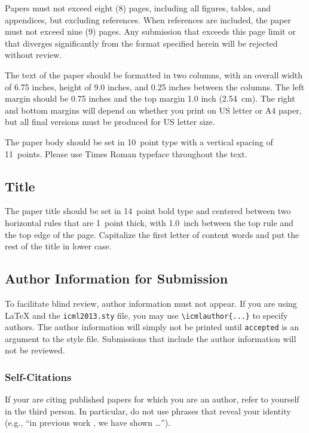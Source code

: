 \documentclass{article}
\begin{document}
Papers must not exceed eight (8) pages, including all figures, tables,
and appendices, but excluding references. When references are included,
the paper must not exceed nine (9) pages. Any submission that exceeds 
this page limit or that diverges significantly from the format specified 
herein will be rejected without review.

The text of the paper should be formatted in two columns, with an
overall width of 6.75 inches, height of 9.0 inches, and 0.25 inches
between the columns. The left margin should be 0.75 inches and the top
margin 1.0 inch (2.54~cm). The right and bottom margins will depend on
whether you print on US letter or A4 paper, but all final versions
must be produced for US letter size.

The paper body should be set in 10~point type with a vertical spacing
of 11~points. Please use Times Roman typeface throughout the text.

\subsection{Title}

The paper title should be set in 14~point bold type and centered
between two horizontal rules that are 1~point thick, with 1.0~inch
between the top rule and the top edge of the page. Capitalize the
first letter of content words and put the rest of the title in lower
case.

\subsection{Author Information for Submission}
\label{author info}

To facilitate blind review, author information must not appear.  If
you are using \LaTeX\/ and the \texttt{icml2013.sty} file, you may use
\verb+\icmlauthor{...}+ to specify authors.  The author information
will simply not be printed until {\tt accepted} is an argument to the
style file. Submissions that include the author information will not
be reviewed.

\subsubsection{Self-Citations}

If your are citing published papers for which you are an author, refer
to yourself in the third person. In particular, do not use phrases
that reveal your identity (e.g., ``in previous work \cite{langley00}, we 
have shown \ldots'').
\end{document}
